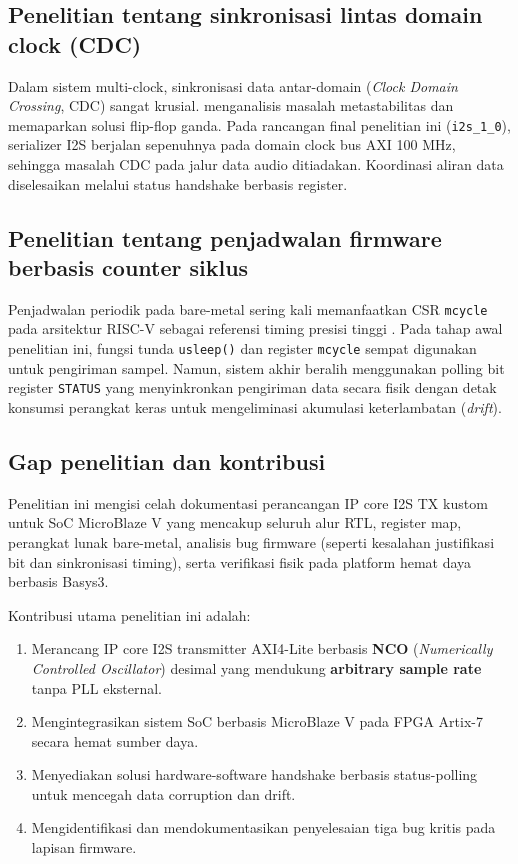 \subsection{Penelitian tentang sinkronisasi lintas domain clock (CDC)}

Dalam sistem multi-clock, sinkronisasi data antar-domain (\textit{Clock Domain Crossing}, CDC) sangat krusial. \citep{ginosar_metastability_2011} menganalisis masalah metastabilitas dan memaparkan solusi flip-flop ganda. Pada rancangan final penelitian ini (\texttt{i2s\_1\_0}), serializer I2S berjalan sepenuhnya pada domain clock bus AXI 100 MHz, sehingga masalah CDC pada jalur data audio ditiadakan. Koordinasi aliran data diselesaikan melalui status handshake berbasis register.

\subsection{Penelitian tentang penjadwalan firmware berbasis counter siklus}

Penjadwalan periodik pada bare-metal sering kali memanfaatkan CSR \texttt{mcycle} pada arsitektur RISC-V sebagai referensi timing presisi tinggi \citep{riscv_isa_vol1_2019}. Pada tahap awal penelitian ini, fungsi tunda \texttt{usleep()} dan register \texttt{mcycle} sempat digunakan untuk pengiriman sampel. Namun, sistem akhir beralih menggunakan polling bit register \texttt{STATUS} yang menyinkronkan pengiriman data secara fisik dengan detak konsumsi perangkat keras untuk mengeliminasi akumulasi keterlambatan (\textit{drift}).

\subsection{Gap penelitian dan kontribusi}

Penelitian ini mengisi celah dokumentasi perancangan IP core I2S TX kustom untuk SoC MicroBlaze V yang mencakup seluruh alur RTL, register map, perangkat lunak bare-metal, analisis bug firmware (seperti kesalahan justifikasi bit dan sinkronisasi timing), serta verifikasi fisik pada platform hemat daya berbasis Basys3. 

Kontribusi utama penelitian ini adalah:
\begin{enumerate}
    \item Merancang IP core I2S transmitter AXI4-Lite berbasis \textbf{NCO} (\textit{Numerically Controlled Oscillator}) desimal yang mendukung \textbf{arbitrary sample rate} tanpa PLL eksternal.
    \item Mengintegrasikan sistem SoC berbasis MicroBlaze V pada FPGA Artix-7 secara hemat sumber daya.
    \item Menyediakan solusi hardware-software handshake berbasis status-polling untuk mencegah data corruption dan drift.
    \item Mengidentifikasi dan mendokumentasikan penyelesaian tiga bug kritis pada lapisan firmware.
\end{enumerate}

